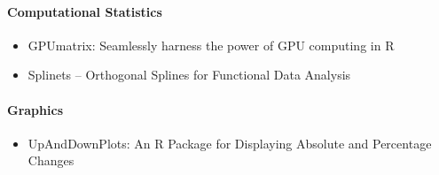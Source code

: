 \hypertarget{computational-statistics}{%
\paragraph{Computational Statistics}\label{computational-statistics}}

\begin{itemize}
\tightlist
\item
  GPUmatrix: Seamlessly harness the power of GPU computing in R
\item
  Splinets -- Orthogonal Splines for Functional Data Analysis
\end{itemize}

\hypertarget{graphics}{%
\paragraph{Graphics}\label{graphics}}

\begin{itemize}
\tightlist
\item
  UpAndDownPlots: An R Package for Displaying Absolute and Percentage Changes
\end{itemize}


\address{%
Mark P.J. van der Loo\\
Statistics Netherlands and Leiden University\\%
\\
%
\url{https://journal.r-project.org}\\%
%
\href{mailto:r-journal@r-project.org}{\nolinkurl{r-journal@r-project.org}}%
}
